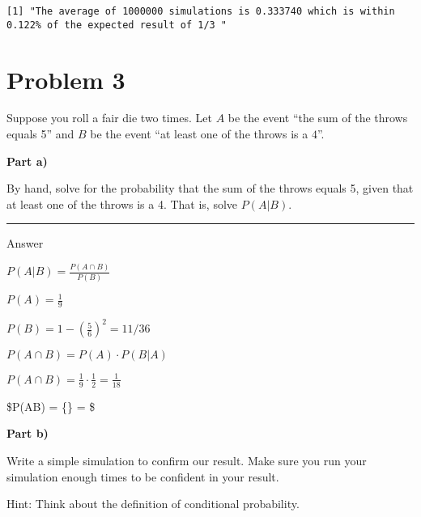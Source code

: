 \documentclass[
  letterpaper,
  DIV=11,
  numbers=noendperiod]{scrartcl}
\begin{document}
\begin{verbatim}
[1] "The average of 1000000 simulations is 0.333740 which is within 0.122% of the expected result of 1/3 "
\end{verbatim}

\section{Problem 3}\label{problem-3}

Suppose you roll a fair die two times. Let \(A\) be the event ``the sum
of the throws equals 5'' and \(B\) be the event ``at least one of the
throws is a \(4\)''.

\textbf{Part a)}

By hand, solve for the probability that the sum of the throws equals 5,
given that at least one of the throws is a 4. That is, solve \(P(A|B)\).

\begin{center}\rule{0.5\linewidth}{0.5pt}\end{center}

Answer

\(P(A|B) = \frac{P(A\cap B)}{P(B)}\)

\(P(A) = \frac{1}{9}\)

\(P(B) = 1-(\frac{5}{6})^2 = 11/36\)

\(P(A \cap B) = P(A)\cdot P(B|A)\)

\(P(A \cap B) = \frac{1}{9} \cdot \frac{1}{2} = \frac{1}{18}\)

\$P(A\textbar B) =  \{\} = 
 \$

\textbf{Part b)}

Write a simple simulation to confirm our result. Make sure you run your
simulation enough times to be confident in your result.

Hint: Think about the definition of conditional probability.
\end{document}
